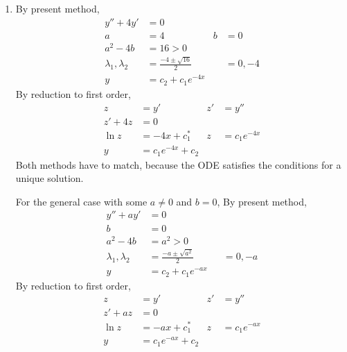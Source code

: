 \begin{enumerate}
\begin{enumerate}
              \item By present method,
                    \begin{align}
                        y'' + 4y'                & = 0                                        \\
                        a                        & = 4                          & b & = 0     \\
                        a^{2} - 4b               & = 16 > 0                                   \\
                        \lambda_{1}, \lambda_{2} & = \frac{-4 \pm \sqrt{16}}{2} &   & = 0, -4 \\
                        y                        & = c_{2} + c_{1}e^{-4x}
                    \end{align}
                    By reduction to first order,
                    \begin{align}
                        z       & = y'                   & z' & = y''          \\
                        z' + 4z & = 0                                          \\
                        \ln z   & = -4x + c_{1}^{*}      & z  & = c_{1}e^{-4x} \\
                        y       & = c_{1}e^{-4x} + c_{2}
                    \end{align}
                    Both methods have to match, because the ODE satisfies the conditions for a
                    unique solution. \par
                    For the general case with some $ a \neq 0 $ and $ b = 0 $,
                    By present method,
                    \begin{align}
                        y'' + ay'                & = 0                                          \\
                        b                        & = 0                                          \\
                        a^{2} - 4b               & = a^{2} > 0                                  \\
                        \lambda_{1}, \lambda_{2} & = \frac{-a \pm \sqrt{a^{2}}}{2} &  & = 0, -a \\
                        y                        & = c_{2} + c_{1}e^{-ax}
                    \end{align}
                    By reduction to first order,
                    \begin{align}
                        z       & = y'                   & z' & = y''          \\
                        z' + az & = 0                                          \\
                        \ln z   & = -ax + c_{1}^{*}      & z  & = c_{1}e^{-ax} \\
                        y       & = c_{1}e^{-ax} + c_{2}
                    \end{align}


\end{enumerate}
\end{enumerate}
